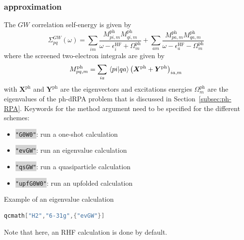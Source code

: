 \documentclass[aip,jcp,reprint,noshowkeys,superscriptaddress]{revtex4-1}
\newcommand{\GW}{\text{$GW$}}
\newcommand{\HF}{\text{HF}}
\newcommand{\ph}{\text{ph}}
\newcommand{\ep}{\epsilon}
\newcommand{\bX}{\bm{X}}
\newcommand{\bY}{\bm{Y}}
\newcommand{\Sigm}{\Sigma}
\newcommand{\sERI}[2]{M_{#1}^{#2}}
\newcommand{\Ome}{\Omega}
\newcommand{\keyword}[1]{{\colorbox{lightgray}{\texttt{#1}}}}
\begin{document}
\subsubsection*{{\GW} approximation}
The $\GW$ correlation self-energy is given by
\begin{equation}
	\Sigm_{pq}^{\GW}(\omega) 
	= \sum_{im} \frac{\sERI{pi,m}{\ph}\sERI{qi,m}{\ph}}{\omega - \ep_{i}^{\HF} + \Ome_{m}^{\ph}}
	+ \sum_{am} \frac{\sERI{pa,m}{\ph}\sERI{qa,m}{\ph}}{\omega - \ep_{a}^{\HF} - \Ome_{m}^{\ph}}
\end{equation}
where the screened two-electron integrals are given by 
\begin{equation}
	\sERI{pq,m}{\ph} = \sum_{ia} \braket*{pi}{qa} \qty(\bX^{\ph} + \bY^{\ph} )_{ia,m}
\end{equation}
with $\bX^{\ph}$ and $\bY^{\ph}$ are the eigenvectors and excitations energies $\Ome_{m}^{\ph}$ are the eigenvalues of the ph-dRPA problem that is discussed in Section~\ref{subsec:ph-RPA}.
Keywords for the method argument need to be specified for the different schemes: 
\begin{itemize}
\item \keyword{"G0W0"}: run a one-shot calculation
\item \keyword{"evGW"}: run an eigenvalue calculation 
\item \keyword{"qsGW"}: run a quasiparticle calculation 
\item \keyword{"upfG0W0"}: run an upfolded calculation
\end{itemize}

Example of an eigenvalue calculation
\begin{lstlisting}[extendedchars=true,language=Mathematica]
	qcmath["H2","6-31g",{"evGW"}]
\end{lstlisting}
Note that here, an RHF calculation is done by default.
\end{document}
